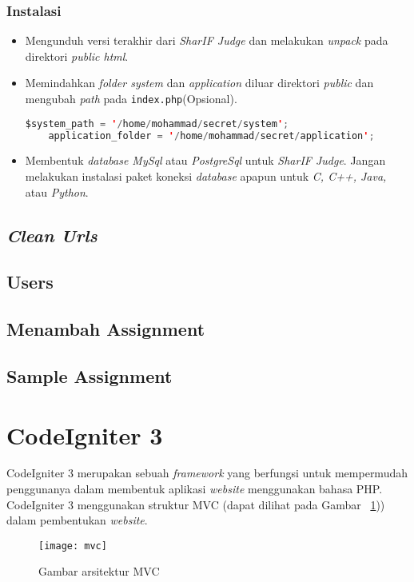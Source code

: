 \subsubsection{Instalasi}
\begin{itemize}
\item Mengunduh versi terakhir dari \textit{SharIF Judge} dan melakukan \textit{unpack} pada direktori \textit{public html}.
\item Memindahkan \textit{folder system} dan \textit{application} diluar direktori \textit{public} dan mengubah \textit{path} pada \verb|index.php|(Opsional).
\begin{lstlisting}[language=Java, caption=Contoh \textit{path} pada halaman index.php, label=kode:movesystemandapp]
	$system_path = '/home/mohammad/secret/system';
	application_folder = '/home/mohammad/secret/application';
\end{lstlisting}
\item Membentuk \textit{database MySql} atau \textit{PostgreSql} untuk \textit{SharIF Judge}. Jangan melakukan instalasi paket koneksi \textit{database} apapun untuk \textit{C, C++, Java,} atau \textit{Python}.

\end{itemize}

\subsection{\textit{Clean Urls}}


\subsection{Users}
\subsection{Menambah Assignment}
\subsection{Sample Assignment}

\section{CodeIgniter 3}
\label{sec:ci3} 
 
CodeIgniter 3 merupakan sebuah \textit{framework} yang berfungsi untuk mempermudah penggunanya dalam membentuk aplikasi \textit{website} menggunakan bahasa PHP. CodeIgniter 3 menggunakan struktur MVC (dapat dilihat pada Gambar ~\ref{fig:mvc})) dalam pembentukan \textit{website}.
\begin{figure}[H]
	\centering  
	\texttt{[image: mvc]}  
	\caption[Gambar arsitektur MVC]{Gambar arsitektur MVC} 
	\label{fig:mvc} 
\end{figure} 

